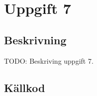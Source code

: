 \section{Uppgift 7}\label{uppgift-7}

\subsection{Beskrivning}
TODO: Beskriving uppgift 7.

\subsection{Källkod}\label{uppgift-7_src}
\inputminted[]{java}{../src/Lab1Uppg07.java}
